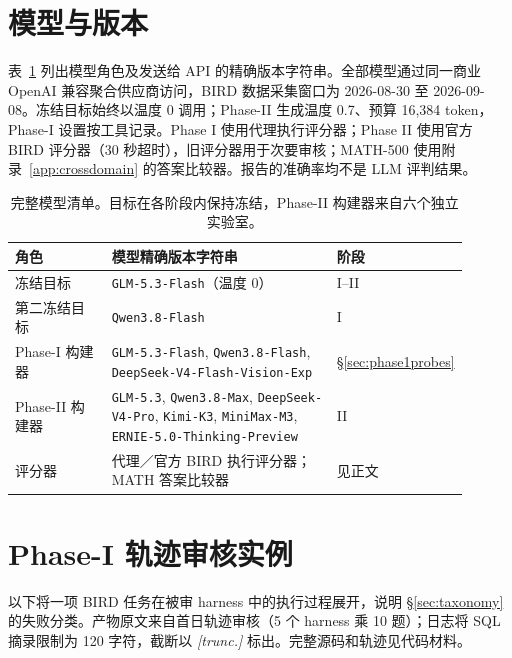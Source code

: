 \section{模型与版本}\label{app:models}
表~\ref{tab:models} 列出模型角色及发送给 API 的精确版本字符串。全部模型通过同一商业 OpenAI 兼容聚合供应商访问，BIRD 数据采集窗口为 2026-08-30 至 2026-09-08。冻结目标始终以温度 0 调用；Phase-II 生成温度 0.7、预算 16,384 token，Phase-I 设置按工具记录。Phase I 使用代理执行评分器；Phase II 使用官方 BIRD 评分器（30 秒超时），旧评分器用于次要审核；MATH-500 使用附录~\ref{app:crossdomain} 的答案比较器。报告的准确率均不是 LLM 评判结果。
\begin{table}[h]\centering\small
\begin{tabular}{p{0.22\linewidth}p{0.52\linewidth}p{0.16\linewidth}}\toprule
角色 & 模型精确版本字符串 & 阶段 \\\midrule
冻结目标 & \texttt{GLM-5.3-Flash}（温度 0） & I--II \\
第二冻结目标 & \texttt{Qwen3.8-Flash} & I \\
Phase-I 构建器 & \texttt{GLM-5.3-Flash}, \texttt{Qwen3.8-Flash}, \texttt{DeepSeek-V4-Flash-Vision-Exp} & \S\ref{sec:phase1probes} \\
Phase-II 构建器 & \texttt{GLM-5.3}, \texttt{Qwen3.8-Max}, \texttt{DeepSeek-V4-Pro}, \texttt{Kimi-K3}, \texttt{MiniMax-M3}, \texttt{ERNIE-5.0-Thinking-Preview} & II \\
评分器 & 代理／官方 BIRD 执行评分器；MATH 答案比较器 & 见正文 \\\bottomrule
\end{tabular}
\caption{完整模型清单。目标在各阶段内保持冻结，Phase-II 构建器来自六个独立实验室。}\label{tab:models}
\end{table}

\section{Phase-I 轨迹审核实例}\label{app:examples}
以下将一项 BIRD 任务在被审 harness 中的执行过程展开，说明 \S\ref{sec:taxonomy} 的失败分类。产物原文来自首日轨迹审核（5 个 harness 乘 10 题）；日志将 SQL 摘录限制为 120 字符，截断以 \emph{[trunc.]} 标出。完整源码和轨迹见代码材料。
